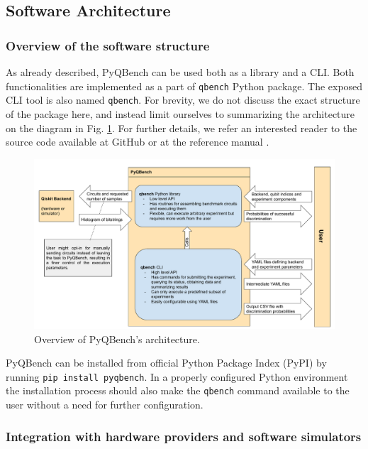 \documentclass[preprint,12pt, a4paper, dvipsnames]{elsarticle}
\newcommand{\1}{{\rm 1\hspace{-0.9mm}l}}
\theoremstyle{definition}
\begin{document}
\subsection{Software Architecture}\label{sec:sortware-architecture}

\subsubsection{Overview of the software structure}
As already described, PyQBench can be used both as a library and a CLI. Both functionalities are
implemented as a part of \texttt{qbench} Python package. The exposed CLI tool is also named
\texttt{qbench}. For brevity, we do not discuss the exact structure of the package here, and instead limit ourselves to summarizing the architecture on the diagram in Fig. \ref{fig:architecture}. For further details, we refer an interested reader to the source code available at GitHub \cite{pyqbenchgithub} or at the
reference manual \cite{pyqbenchdocs}.

\begin{figure}
  \includegraphics[width=\textwidth]{pics/architecture.pdf}
  \caption{Overview of PyQBench's architecture.}
  \label{fig:architecture}
\end{figure}

PyQBench can be installed from official Python Package Index (PyPI) by running \texttt{pip install
pyqbench}. In a properly configured Python environment the installation process should also make the
\texttt{qbench} command available to the user without a need for further configuration.

\subsubsection{Integration with hardware providers and software simulators}
\end{document}
